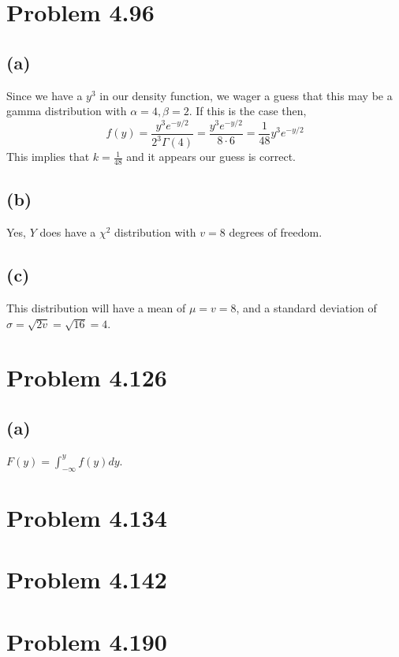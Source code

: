 \documentclass{article}
\theoremstyle{definition}
\begin{document}
\section*{Problem 4.96}

    \subsection*{(a)}
        Since we have a $y^3$ in our density function, we wager a guess that this may be a gamma distribution with 
        $\alpha = 4, \beta = 2$. If this is the case then,
        \[
            f(y) = \frac{y^3 e^{-y / 2}}{2^3 \Gamma(4)} = \frac{y^3 e^{-y / 2}}{8 \cdot 6} = \frac {1}{48} y^3 e^{-y / 2} 
        \]
        This implies that $k = \frac{1}{48}$ and it appears our guess is correct.

    \subsection*{(b)}
        Yes, $Y$ does have a $\chi^2$ distribution with $v=8$ degrees of freedom.

    \subsection*{(c)}
        This distribution will have a mean of $\mu = v = 8$, and a standard deviation of $\sigma = \sqrt{2v} =
         \sqrt{16} = 4$.
        
\section*{Problem 4.126}

    \subsection*{(a)}
    $F(y) = \int_{-\infty}^y f(y) dy$.
\section*{Problem 4.134}
\section*{Problem 4.142}
\section*{Problem 4.190}
\end{document}
